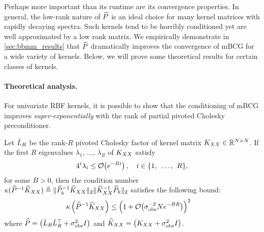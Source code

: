 Perhaps more important than its runtime are its convergence properties.
In general, the low-rank nature of $\widehat{P}$ is an ideal choice for many kernel matrices with rapidly decaying spectra.
Such kernels tend to be horribly conditioned yet are well approximated by a low rank matrix.
We empirically demonstrate in \cref{sec:bbmm_results} that $\widehat{P}$ dramatically improves the convergence of mBCG for a wide variety of kernels.
Below, we will prove some theoretical results for certain classes of kernels.


\paragraph{Theoretical analysis.}
For univariate RBF kernels, it is possible to show that the conditioning of mBCG improves \emph{super-exponentially} with the rank of partial pivoted Cholesky preconditioner.
%
\begin{lemma}
  \label{thm:condition_number}
  Let $\bar{L}_{R}$ be the rank-$R$ pivoted Cholesky factor of kernel matrix $K_{XX} \in \mathbb{R}^{N \times N}$.
  If the first $R$ eigenvalues $\lambda_1$, $\ldots$, $\lambda_R$ of $K_{XX}$ satisfy
	\begin{equation}
		4^{i}\lambda_{i} \leq \bigo{e^{-Bi}}, \quad i \in \{ 1, \:\: \ldots, \:\: R \},
		\label{eqn:pcp_condition}
	\end{equation}
	for some $B>0$, then the condition number $\kappa(\widehat{P}^{-1}\widehat{K}_{XX}) \triangleq \Vert \widehat{P}_{k}^{-1}\widehat{K}_{XX} \Vert_{2} \Vert \widehat{K}_{XX}^{-1}\widehat{P}_{k} \Vert_{2}$
	satisfies the following bound:
  \begin{align}
    \kappa \left( \trainP^{-1}\trainK \right)
    &\leq \Bigl( 1 + \bigo{\sigma^{-2}_\text{obs} N e^{-BR}} \Bigr)^2
		\nonumber
  \end{align}
	where $\widehat{P} = \left( \bar{L}_R \bar{L}_R^\top + \sigma^2_\text{obs} I \right)$ and $\widehat{K}_{XX} = \left( K_{XX} + \sigma^2_\text{obs} I \right)$.
\end{lemma}

